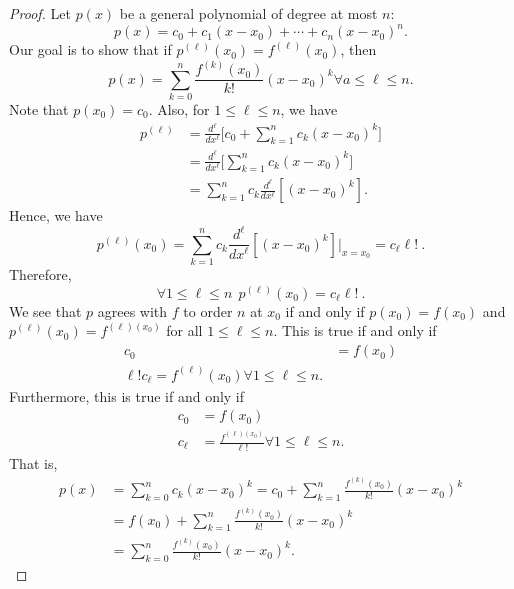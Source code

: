 \begin{proof}
Let \( p(x) \) be a general polynomial of degree at most \( n \):
\[  p(x) = {c}_{0} + {c}_{1} (x - {x}_{0}) + \cdots + {c}_{n} (x - {x}_{0})^{n}. \]
Our goal is to show that if \( p^{(\ell)}({x}_{0}) = f^{(\ell)}({x}_{0}) \), then
\[  p(x) = \sum_{ k= 0  }^{ n } \frac{ f^{(k)}({x}_{0}) }{  k!  }  (x - {x}_{0} )^{k} \forall a \leq  \ell \leq n.  \]
Note that \( p({x}_{0}) = {c}_{0} \). Also, for \( 1 \leq \ell \leq n  \), we have
\begin{align*}
    p^{(\ell)} &= \frac{ d^{\ell} }{ d x^{\ell} }  \Big[ {c}_{0} + \sum_{ k=1  }^{ n } {c}_{k } (x - {x}_{0})^{k } \Big] \\
               &= \frac{ d^{\ell} }{ d x^{\ell} }  \Big[ \sum_{ k=1  }^{ n } {c}_{k } (x - {x}_{0})^{k} \Big] \\
               &= \sum_{ k=1  }^{ n } {c}_{k} \frac{ d^{\ell} }{ d x^{\ell} }  [(x - {x}_{0})^{k }].
\end{align*}
Hence, we have 
\[  p^{(\ell)}({x}_{0}) = \sum_{ k=1  }^{ n } {c}_{k } \frac{ d^{\ell} }{ d x^{\ell} }  [(x - {x}_{0})^{k}] \Big|_{x = {x}_{0}} = {c}_{\ell} \ell!  \ .  \]
Therefore, 
\[  \forall 1 \leq \ell \leq n \ \ p^{(\ell)} ({x}_{0}) = {c}_{\ell} \ell!  \ .\]
We see that \( p \) agrees with \( f  \) to order \( n \) at \( {x}_{0} \) if and only if \( p({x}_{0}) = f({x}_{0}) \) and \( p^{(\ell)}({x}_{0}) = f^{(\ell) ({x}_{0})}  \) for all \( 1 \leq \ell \leq n  \). This is true if and only if
\begin{align*}
    {c}_{0} &= f({x}_{0}) \\
    \ell ! {c}_{\ell} = f^{(\ell)}({x}_{0}) \forall 1 \leq \ell \leq n. 
\end{align*}
Furthermore, this is true if and only if   
\begin{align*}
    {c}_{0} &= f({x}_{0}) \\
    {c}_{\ell} &= \frac{ f^{(\ell)({x}_{0})}  }{ \ell!  } \forall 1 \leq \ell \leq n. 
\end{align*}
That is,
\begin{align*}
    p(x) &= \sum_{ k=0  }^{ n } {c}_{k } (x - {x}_{0})^{k } = {c}_{0} + \sum_{ k=1  }^{ n } \frac{ f^{(k)}({x}_{0}) }{ k!  } (x - {x}_{0})^{k} \\
         &= f({x}_{0}) + \sum_{ k=1  }^{ n } \frac{ f^{(k)}({x}_{0}) }{ k!  } (x - {x}_{0})^{k} \\
         &= \sum_{ k= 0  }^{  n  } \frac{ f^{(k)}({x}_{0} ) }{ k!  } (x - {x}_{0})^{k}.
\end{align*}
\end{proof}
